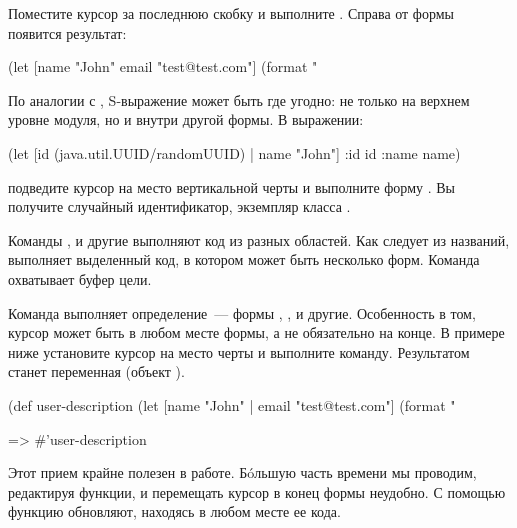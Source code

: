 Поместите курсор за последнюю скобку и выполните . Справа от формы появится результат:

\begin{english}
  \begin{clojure}
(let [name "John"
      email "test@test.com"]
  (format "%
  \end{clojure}
\end{english}

По аналогии с , S-выражение может быть где угодно: не только на верхнем уровне модуля, но и внутри другой формы. В выражении:

\begin{english}
  \begin{clojure}
(let [id (java.util.UUID/randomUUID) |
      name "John"]
  {:id id
   :name name})
  \end{clojure}
\end{english}

подведите курсор на место вертикальной черты и выполните форму . Вы получите случайный идентификатор, экземпляр класса .

Команды ,  и другие выполняют код из разных областей. Как следует из названий,  выполняет выделенный код, в котором может быть несколько форм. Команда  охватывает буфер цели.

Команда  выполняет определение~--- формы , ,  и другие. Особенность в том, курсор может быть в любом месте формы, а не обязательно на конце. В примере ниже установите курсор на место черты и выполните команду. Результатом станет переменная  (объект ).

\begin{english}
  \begin{clojure}
(def user-description
  (let [name "John" |
        email "test@test.com"]
    (format "%

=> #'user-description
  \end{clojure}
\end{english}

Этот прием крайне полезен в работе. Бóльшую часть времени мы проводим, редактируя функции, и перемещать курсор в конец формы неудобно. С помощью  функцию обновляют, находясь в любом месте ее кода.


